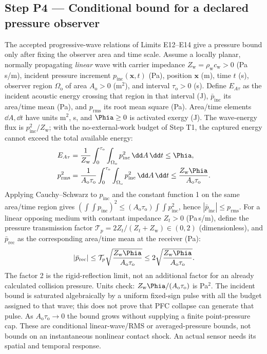 \subsection{Step P4 --- Conditional bound for a declared pressure observer}
The accepted progressive-wave relations of Limits E12--E14 give a pressure bound only after
fixing the observer area and time scale. Assume a locally planar, normally propagating
\emph{linear} wave with carrier impedance $Z_{\mathrm w}=\rho_{\mathrm w}c_{\mathrm w}>0$
(Pa\,s/m), incident pressure increment $p_{\mathrm{inc}}(\mathbf x,t)$ (Pa), position $\mathbf x$ (m),
time $t$ (s), observer region
$\Omega_{\mathrm o}$ of area $A_{\mathrm o}>0$ (m$^2$), and interval $\tau_{\mathrm o}>0$ (s).
Define $E_{A\tau}$ as the incident acoustic energy crossing that region in that interval (J),
$\bar p_{\mathrm{inc}}$ its area/time mean (Pa), and $p_{\mathrm{rms}}$ its root mean square (Pa).
Area/time elements $\dd A,\dd t$ have units m$^2$, s, and $\Phia\ge0$ is activated exergy (J).
The wave-energy flux is $p_{\mathrm{inc}}^2/Z_{\mathrm w}$; with the no-external-work budget
of Step T1, the captured energy cannot exceed the total available energy:
\begin{align}
E_{A\tau}&=\frac{1}{Z_{\mathrm w}}\int_0^{\tau_{\mathrm o}}\int_{\Omega_{\mathrm o}}
p_{\mathrm{inc}}^2\,\dd A\,\dd t\le\Phia,\notag\\
p_{\mathrm{rms}}^2&=\frac{1}{A_{\mathrm o}\tau_{\mathrm o}}
\int_0^{\tau_{\mathrm o}}\int_{\Omega_{\mathrm o}}p_{\mathrm{inc}}^2\,\dd A\,\dd t
\le\frac{Z_{\mathrm w}\Phia}{A_{\mathrm o}\tau_{\mathrm o}}.\label{eq:pressure_rms}
\end{align}
Applying Cauchy--Schwarz to $p_{\mathrm{inc}}$ and the constant function 1 on the same
area/time region gives $(\int\!\int p_{\mathrm{inc}})^2\le
(A_{\mathrm o}\tau_{\mathrm o})\int\!\int p_{\mathrm{inc}}^2$, hence
$|\bar p_{\mathrm{inc}}|\le p_{\mathrm{rms}}$.
For a linear opposing medium with constant impedance $Z_t>0$ (Pa\,s/m), define the pressure
transmission factor $\mathcal T_p=2Z_t/(Z_t+Z_{\mathrm w})\in(0,2)$ (dimensionless), and
$\bar p_{\mathrm{rec}}$ as the corresponding area/time mean at the receiver (Pa):
\begin{equation}
|\bar p_{\mathrm{rec}}|\le\mathcal T_p
\sqrt{\frac{Z_{\mathrm w}\Phia}{A_{\mathrm o}\tau_{\mathrm o}}}
\le2\sqrt{\frac{Z_{\mathrm w}\Phia}{A_{\mathrm o}\tau_{\mathrm o}}}.
\label{eq:pressure_observer}
\end{equation}
The factor 2 is the rigid-reflection limit, not an additional factor for an already calculated
collision pressure. Units check: $Z_{\mathrm w}\Phia/(A_{\mathrm o}\tau_{\mathrm o})$ is Pa$^2$.
The incident bound is saturated algebraically by a uniform fixed-sign pulse with all the budget
assigned to that wave; this does not prove that PFC collapse can generate that pulse.
As $A_{\mathrm o}\tau_{\mathrm o}\to0$ the bound grows without supplying a finite point-pressure
cap. These are conditional linear-wave/RMS or averaged-pressure bounds, not bounds on an
instantaneous nonlinear contact shock. An actual sensor needs its spatial and temporal response.
